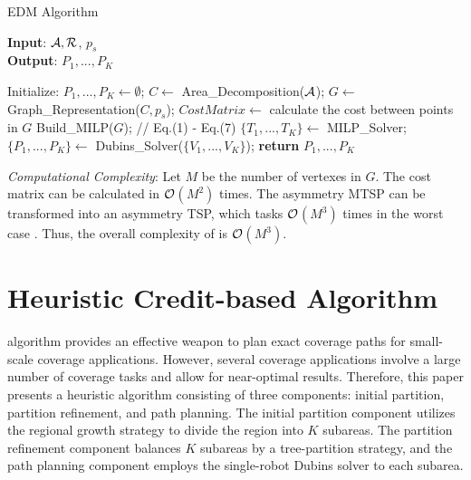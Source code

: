 \documentclass[journal,article,submit,pdftex,moreauthors]{Definitions/mdpi}
\begin{document}
\begin{algorithm}[htbp]
  \caption{EDM Algorithm}
  \label{alg:EMD Algorithm}
\textbf{Input}:  $ \cal{A}, R$, $p_s$\\
\textbf{Output}: $P_1, ...,P_K$
\begin{algorithmic}[1] %
\STATE Initialize: $P_1, ...,P_K \gets \emptyset$;
\STATE $C \gets$ Area\_Decomposition($ \cal{A}$);
\STATE $G \gets$ Graph\_Representation($C, p_s$);
\STATE $CostMatrix \gets$ calculate the cost between points in $G$
\STATE Build\_MILP($G$); // Eq.(1) - Eq.(7)
\STATE $\{T_1, ...,T_K\} \gets$  MILP\_Solver;
\STATE $\{P_1, ...,P_K\} \gets$  Dubins\_Solver($\{V_1,...,V_K\}$);
\STATE \textbf{return} $P_1, ...,P_K$
\end{algorithmic}
\end{algorithm}


\textit{Computational Complexity}: Let $M$ be the number of vertexes in $G$. The cost matrix can be calculated in $\cal{O}$$(M^2)$ times. The asymmetry MTSP can be transformed into an asymmetry TSP, which tasks $\cal{O}$$(M^3)$ times in the worst case \cite{frieze1982worst}. Thus, the overall complexity of  is $\cal{O}$$(M^{3})$.


\section{ Heuristic Credit-based  Algorithm}
\label{Sec_CMD}
 algorithm provides an effective weapon to plan exact coverage paths for small-scale coverage applications. However, several coverage applications involve a large number of coverage tasks and allow for near-optimal results. Therefore, this paper presents a heuristic  algorithm consisting of three components: initial partition, partition refinement, and path planning. The initial partition component utilizes the regional growth strategy to divide the region into $K$ subareas. The partition refinement component balances $K$ subareas by a tree-partition strategy, and the path planning component employs the single-robot Dubins solver \cite{c25} to each subarea.

\end{document}
